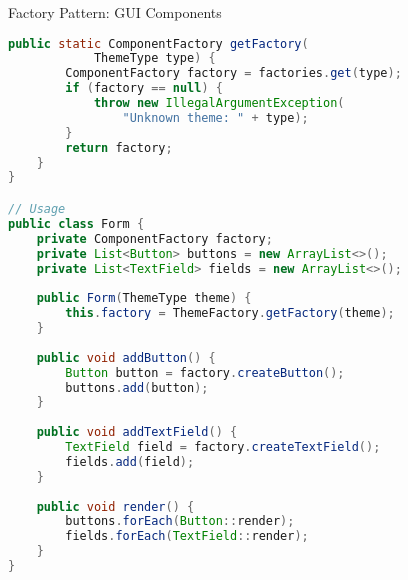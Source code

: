 \begin{example2}[breakable]{Factory Pattern: GUI Components}
\begin{lstlisting}[language=Java, style=basesmol]
    public static ComponentFactory getFactory(
            ThemeType type) {
        ComponentFactory factory = factories.get(type);
        if (factory == null) {
            throw new IllegalArgumentException(
                "Unknown theme: " + type);
        }
        return factory;
    }
}

// Usage
public class Form {
    private ComponentFactory factory;
    private List<Button> buttons = new ArrayList<>();
    private List<TextField> fields = new ArrayList<>();
    
    public Form(ThemeType theme) {
        this.factory = ThemeFactory.getFactory(theme);
    }
    
    public void addButton() {
        Button button = factory.createButton();
        buttons.add(button);
    }
    
    public void addTextField() {
        TextField field = factory.createTextField();
        fields.add(field);
    }
    
    public void render() {
        buttons.forEach(Button::render);
        fields.forEach(TextField::render);
    }
}
\end{lstlisting}
\end{example2}

